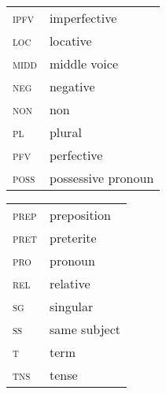 \documentclass[output=paper,newtxmath,modfonts,nonflat,hidelinks]{langsci/langscibook}
\begin{document}
\begin{tabularx}{.45\textwidth}{>{\scshape}lQ}
 ipfv & imperfective\\ 
 loc & locative\\
 midd & middle voice\\
 neg & negative\\
 non & non\\
 pl & plural\\
 pfv & perfective\\
 poss & possessive {pronoun}\\
\end{tabularx}
\begin{tabularx}{.45\textwidth}{>{\scshape}lQ} prep & preposition\\
 pret & preterite\\
 pro & {pronoun}\\
 rel & relative\\
 sg & singular\\
 ss & same {subject}\\
 t & term\\
 tns & tense
\end{tabularx}


\sloppy
\printbibliography[heading=subbibliography,notkeyword=this]
\end{document}
